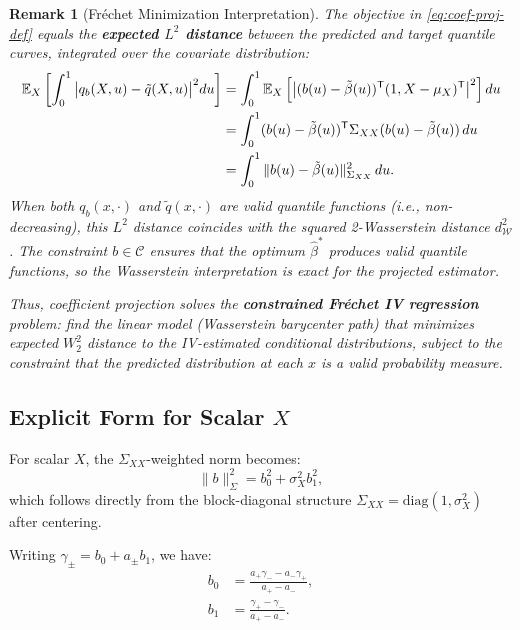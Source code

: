 \documentclass[12pt]{article}
\newcommand{\E}{\mathbb{E}}
\newcommand{\T}{\mathsf{T}}
\newtheorem{remark}{Remark}
\begin{document}
\begin{remark}[Fréchet Minimization Interpretation]\label{rem:frechet-interp}
The objective in \eqref{eq:coef-proj-def} equals the \textbf{expected $L^2$ distance} between the predicted and target quantile curves, integrated over the covariate distribution:
\begin{align}
\E_X\left[ \int_0^1 \big| q_b(X, u) - \tilde{q}(X, u) \big|^2 du \right]
&= \int_0^1 \E_X\left[ \big| (b(u) - \tilde{\beta}(u))^\T (1, X-\mu_X)^\T \big|^2 \right] du \notag \\
&= \int_0^1 (b(u) - \tilde{\beta}(u))^\T \Sigma_{XX} (b(u) - \tilde{\beta}(u)) \, du \notag \\
&= \int_0^1 \|b(u) - \tilde{\beta}(u)\|_{\Sigma_{XX}}^2 \, du.
\end{align}
When both $q_b(x, \cdot)$ and $\tilde{q}(x, \cdot)$ are valid quantile functions (i.e., non-decreasing), this $L^2$ distance coincides with the squared 2-Wasserstein distance $d_{\mathcal{W}}^2$. The constraint $b \in \mathcal{C}$ ensures that the optimum $\hat{\beta}^*$ produces valid quantile functions, so the Wasserstein interpretation is exact for the projected estimator.

Thus, coefficient projection solves the \textbf{constrained Fréchet IV regression} problem: find the linear model (Wasserstein barycenter path) that minimizes expected $W_2^2$ distance to the IV-estimated conditional distributions, subject to the constraint that the predicted distribution at each $x$ is a valid probability measure.
\end{remark}

\subsection{Explicit Form for Scalar $X$}

For scalar $X$, the $\Sigma_{XX}$-weighted norm becomes:
\begin{equation}
\|b\|_{\Sigma}^2 = b_0^2 + \sigma_X^2 b_1^2,
\end{equation}
which follows directly from the block-diagonal structure $\Sigma_{XX} = \text{diag}(1, \sigma_X^2)$ after centering.

Writing $\gamma_\pm = b_0 + a_\pm b_1$, we have:
\begin{align}
b_0 &= \frac{a_+ \gamma_- - a_- \gamma_+}{a_+ - a_-}, \\
b_1 &= \frac{\gamma_+ - \gamma_-}{a_+ - a_-}.
\end{align}
\end{document}
